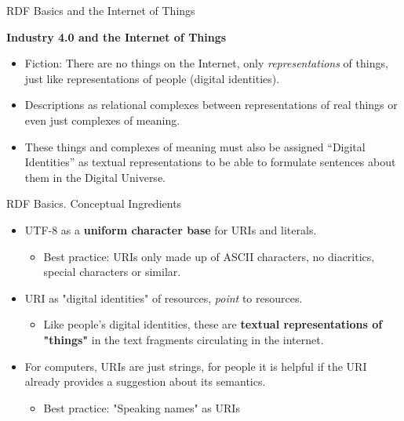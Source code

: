 \documentclass{beamer}
\newcommand{\ueberschrift}[1]{\begin{center}\bf #1\end{center}}
\begin{document}
\begin{frame}{RDF Basics and the Internet of Things}
  \ueberschrift{Industry 4.0 and the Internet of Things}
  \begin{itemize}
  \item Fiction: There are no things on the Internet, only
    \emph{representations} of things, just like representations of people
    (digital identities).
  \item Descriptions as relational complexes between representations of real
    things or even just complexes of meaning.
  \item These things and complexes of meaning must also be assigned “Digital
    Identities” as textual representations to be able to formulate sentences
    about them in the Digital Universe.
  \end{itemize}
\end{frame}
\begin{frame}{RDF Basics. Conceptual Ingredients}
  \begin{itemize}  
  \item UTF-8 as a \textbf{uniform character base} for URIs and literals.
    \begin{itemize}  
    \item[] Best practice: URIs only made up of ASCII characters, no diacritics,
      special characters or similar.
    \end{itemize}
  \item URI as "digital identities" of resources, \emph{point} to resources. 
    \begin{itemize}  
    \item[] Like people's digital identities, these are \textbf{textual
      representations of "things"} in the text fragments circulating in the
      internet.
    \end{itemize}
  \item For computers, URIs are just strings, for people it is helpful if the
    URI already provides a suggestion about its semantics. 
    \begin{itemize}  
    \item[] Best practice: "Speaking names" as URIs
    \end{itemize}
  \end{itemize}
\end{frame}
\end{document}

